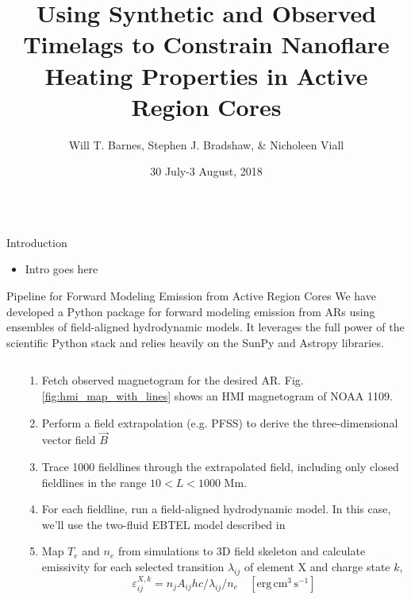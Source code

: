 \documentclass[final]{beamer}
\title[]{Using Synthetic and Observed Timelags to Constrain Nanoflare\\ Heating Properties in Active Region Cores}
\author[Barnes, Bradshaw, \& Viall]{Will T. Barnes\inst{1}, Stephen J. Bradshaw\inst{1}, \& Nicholeen Viall\inst{2}}
\institute[]{\inst{1} Department of Physics and Astronomy, Rice University \inst{2} NASA Goddard Space Flight Center}
\date{30 July-3 August, 2018}
\begin{document}
\begin{frame}
  \begin{columns}[T]
  \hfill
  \begin{column}{0.49\linewidth}
    \begin{block}{Introduction}
    \begin{itemize}
      \item Intro goes here
    \end{itemize}
    \end{block}
    \begin{block}{Pipeline for Forward Modeling Emission from Active Region Cores}
    We have developed a Python package for forward modeling emission from ARs using ensembles of field-aligned hydrodynamic models. It leverages the full power of the scientific Python stack and relies heavily on the SunPy \citep{sunpy_community_sunpypython_2015} and Astropy \citep{astropy_collaboration_astropy:_2013} libraries.
      \begin{columns}[T]
      \begin{column}{0.39\columnwidth}
      \end{column}
      \begin{column}{0.59\columnwidth}
        \begin{enumerate}
          \item Fetch observed magnetogram for the desired AR. Fig. \ref{fig:hmi_map_with_lines} shows an HMI magnetogram of NOAA 1109. 
          \item Perform a field extrapolation (e.g. PFSS) to derive the three-dimensional vector field $\vec{B}$
          \item Trace 1000 fieldlines through the extrapolated field, including only closed fieldlines in the range $10<L<1000$ Mm.
          \item For each fieldline, run a field-aligned hydrodynamic model. In this case, we'll use the two-fluid EBTEL model described in \citet{barnes_inference_2016}
          \item Map $T_e$ and $n_e$ from simulations to 3D field skeleton and calculate emissivity for each selected transition $\lambda_{ij}$ of element $\mathrm{X}$ and charge state $k$,
            \begin{equation*}
              \varepsilon_{ij}^{X,k} = n_jA_{ij}hc/\lambda_{ij}/n_e \quad [\mathrm{erg}\,\mathrm{cm}^{3}\,\mathrm{s}^{-1}]

\end{equation*}
\end{enumerate}
\end{column}
\end{columns}
\end{block}
\end{column}
\end{columns}
\end{frame}
\end{document}
